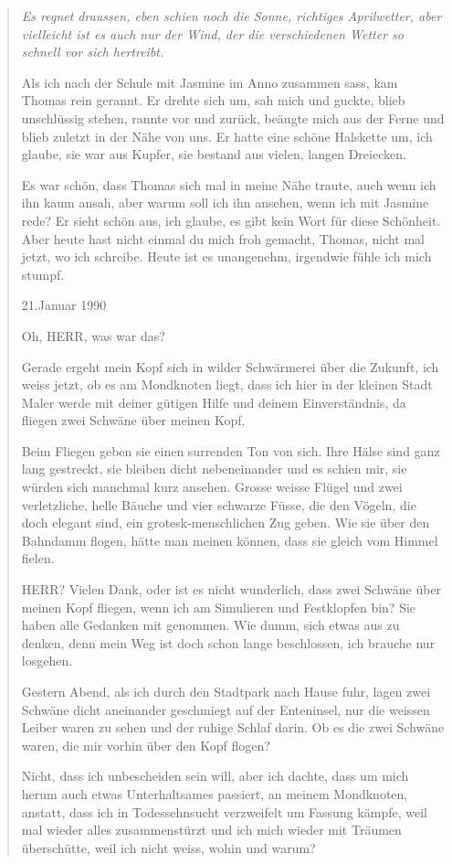 \documentclass[10pt,titlepage,a5paper]{book}
\newenvironment{tg}{\begin{quote}\em}{\end{quote}}
\begin{document}
\begin{tg}
Es regnet draussen, eben schien noch die Sonne, richtiges Aprilwetter, aber vielleicht ist es auch nur der Wind, der die verschiedenen Wetter so schnell vor sich hertreibt.

Als ich nach der Schule mit Jasmine im Anno zusammen sass, kam Thomas rein gerannt. Er drehte sich um, sah mich und guckte, blieb unschlüssig stehen, rannte vor und zurück, beäugte mich aus der Ferne und blieb zuletzt in der Nähe von uns. Er hatte eine schöne Halskette um, ich glaube, sie war aus Kupfer, sie bestand aus vielen, langen Dreiecken.

Es war schön, dass Thomas sich mal in meine Nähe traute, auch wenn ich ihn kaum ansah, aber warum soll ich ihn ansehen, wenn ich mit Jasmine rede? Er sieht schön aus, ich glaube, es gibt kein Wort für diese Schönheit.
Aber heute hast nicht einmal du mich froh gemacht, Thomas, nicht mal jetzt, wo ich schreibe. Heute ist es unangenehm, irgendwie fühle ich mich stumpf.

21.Januar 1990

Oh, HERR, was war das?

Gerade ergeht mein Kopf sich in wilder Schwärmerei über die Zukunft, ich weiss jetzt, ob es am Mondknoten liegt, dass ich hier in der kleinen Stadt Maler werde mit deiner gütigen Hilfe und deinem Einverständnis, da fliegen zwei Schwäne über meinen Kopf.

Beim Fliegen geben sie einen surrenden Ton von sich. Ihre Hälse sind ganz lang gestreckt, sie bleiben dicht nebeneinander und es schien mir, sie würden sich manchmal kurz ansehen. Grosse weisse Flügel und zwei verletzliche, helle Bäuche und vier schwarze Füsse, die den Vögeln, die doch elegant sind, ein grotesk-menschlichen Zug geben. Wie sie über den Bahndamm flogen, hätte man meinen können, dass sie gleich vom Himmel fielen.

HERR? Vielen Dank, oder ist es nicht wunderlich, dass zwei Schwäne über meinen Kopf fliegen, wenn ich am Simulieren und Festklopfen bin? Sie haben alle Gedanken mit genommen. Wie dumm, sich etwas aus zu denken, denn mein Weg ist doch schon lange beschlossen, ich brauche nur losgehen.

Gestern Abend, als ich durch den Stadtpark nach Hause fuhr, lagen zwei Schwäne dicht aneinander geschmiegt auf der Enteninsel, nur die weissen Leiber waren zu sehen und der ruhige Schlaf darin. Ob es die zwei Schwäne waren, die mir vorhin über den Kopf flogen?

Nicht, dass ich unbescheiden sein will, aber ich dachte, dass um mich herum auch etwas Unterhaltsames passiert, an meinem Mondknoten, anstatt, dass ich in Todessehnsucht verzweifelt um Fassung kämpfe, weil mal wieder alles zusammenstürzt und ich mich wieder mit Träumen überschütte, weil ich nicht weiss, wohin und warum?


\end{tg}
\end{document}
